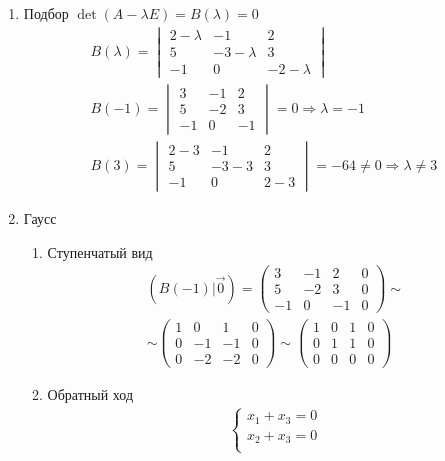 \documentclass{article}
\begin{document}
\begin{enumerate}
	\item Подбор $\det (A - \lambda E) = B(\lambda) = 0$
	\begin{gather*}
		B(\lambda) = \begin{vmatrix}
			2 - \lambda & -1 & 2 \\
			5 & -3 - \lambda & 3 \\
			-1 & 0 & -2 - \lambda
		\end{vmatrix} \\
		B(-1) = \begin{vmatrix}
			3 & -1 & 2 \\
			5 & -2 & 3 \\
			-1 & 0 & -1
		\end{vmatrix} = 0 \Rightarrow \lambda = -1 \\
		B(3) = \begin{vmatrix}
			2 - 3 & -1 & 2 \\
			5 & -3 - 3 & 3 \\
			-1 & 0 & 2 - 3
		\end{vmatrix} = -64 \ne 0 \Rightarrow \lambda \ne 3
	\end{gather*}
	\item Гаусс
	\begin{enumerate}
		\item Ступенчатый вид
		\begin{gather*}
			(B(-1) | \vec{0}) = \begin{pmatrix}
				3 & -1 & 2 & 0 \\
				5 & -2 & 3 & 0 \\
				-1 & 0 & -1 & 0
			\end{pmatrix} \sim \\
			\sim \begin{pmatrix}
				1 & 0 & 1 & 0 \\
				0 & -1 & -1 & 0 \\
				0 & -2 & -2 & 0
			\end{pmatrix} \sim \begin{pmatrix}
				1 & 0 & 1 & 0 \\
				0 & 1 & 1 & 0 \\
				0 & 0 & 0 & 0
			\end{pmatrix} 
		\end{gather*}
		\item Обратный ход
		\begin{gather*}
			\begin{cases}
				x_1 + x_3 = 0 \\
				x_2 + x_3 = 0 \\

\end{cases}
\end{gather*}
\end{enumerate}
\end{enumerate}
\end{document}
